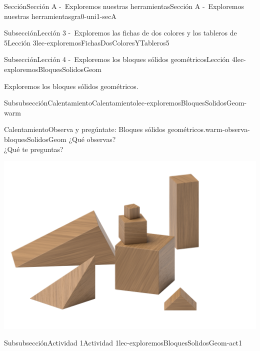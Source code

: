 \documentclass[twoside,10pt,]{article}
\begin{document}
\begin{sectionptx}{Sección}{Sección A -~Exploremos nuestras herramientas}{}{Sección A -~Exploremos nuestras herramientas}{}{}{gra0-uni1-secA}
\begin{subsectionptx}{Subsección}{Lección 3 -~Exploremos las fichas de dos colores y los tableros de 5}{}{Lección 3}{}{}{lec-exploremosFichasDosColoresYTableros5}
\end{subsectionptx}
%
%
\typeout{************************************************}
\typeout{************************************************}
%
\begin{subsectionptx}{Subsección}{Lección 4 -~Exploremos los bloques sólidos geométricos}{}{Lección 4}{}{}{lec-exploremosBloquesSolidosGeom}
\begin{introduction}{}%
Exploremos los bloques sólidos geométricos.%
\end{introduction}%
%
%
\typeout{************************************************}
\typeout{************************************************}
%
\begin{subsubsectionptx}{Subsubsección}{Calentamiento}{}{Calentamiento}{}{}{lec-exploremosBloquesSolidosGeom-warm}
\begin{exploration}{Calentamiento}{Observa y pregúntate: Bloques sólidos geométricos.}{warm-observa-bloquesSolidosGeom}%
¿Qué observas?\\
 ¿Qué te preguntas?%
\begin{image}{0.25}{0.5}{0.25}{}%
\includegraphics[width=\linewidth]{external/png-source/K.1.A Beta Student Workbook.Geoblocks.png}
\end{image}%
\end{exploration}%
\end{subsubsectionptx}
%
%
\typeout{************************************************}
\typeout{************************************************}
%
\begin{subsubsectionptx}{Subsubsección}{Actividad 1}{}{Actividad 1}{}{}{lec-exploremosBloquesSolidosGeom-act1}

\end{subsubsectionptx}
\end{subsectionptx}
\end{sectionptx}
\end{document}
